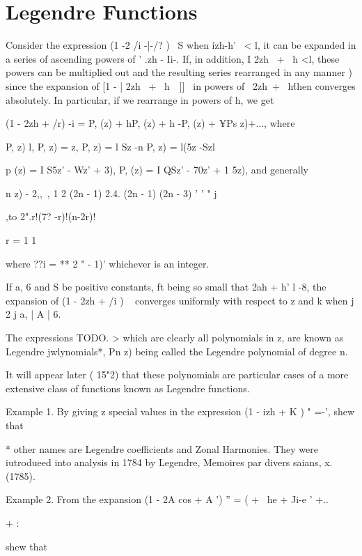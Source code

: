 %
%
\chapter{Legendre Functions} 


Consider the expression (1 -2 /i -|-/? )~ S when \'izh-h' \ < l, it
can be expanded in a series of ascending powers of ' .zh - Ii-. If, in
addition, I 2zh \ + \ h <l, these powers can be multiplied out and the
resulting series rearranged in any manner ) since the expansion
of [1 - | 2zh \ + \ h\ \ ]]~ in powers of \ 2zh\ + \ h\' then
converges absolutely. In particular, if we rearrange in powers of h,
we get

(1 - 2zh + /r) -i = P, (z) + hP, (z) + h -P, (z) + ¥Ps z)+..., where

P, z) l, P, z) = z, P, z) = l Sz -n P, z) = l(5z -Szl

p (z) = I S5z' - Wz' + 3), P, (z) = I QSz' - 70z' + 1 5z), and
generally

 n z) - 2,, \,, 1 2 (2n - 1) 2.4. (2n - 1) (2n - 3) ' ' " j

,to 2".r!(7? -r)!(n-2r)!

r = 1 1

where ??i = ** 2 " - 1)' whichever is an integer.

If a, 6 and S be positive constants, ft being so small that 2ah + h' l
-8, the expansion of (1 - 2zh + /i ) ~ converges uniformly with
respect to z and k when j 2 j a, | A | 6.

The expressions TODO.    > which are clearly all
polynomials in z, are known as Legendre jwlynomials*, Pn z) being
called the Legendre polynomial of degree n.

It will appear later ( 15"2) that these polynomials are particular
cases of a more extensive class of functions known as Legendre
functions.

Example 1. By giving z special values in the expression (1 - izh + K )
" =-', shew that

* other names are Legendre coefficients and Zonal Harmonies. They were
iutrodueed into analysis in 1784 by Legendre, Memoires par divers
saians, x. (1785).

%
%

Example 2. From the expansion (1 - 2A cos + A ') '' = ( + \ he + Ji-e
' +..\

+ :

shew that

